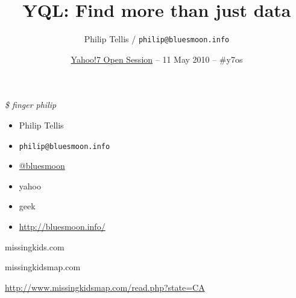 \documentclass{beamer}
\author{Philip Tellis / \texttt{philip@bluesmoon.info}}
\title{YQL: Find more than just data}
\date{\href{http://upcoming.yahoo.com/event/5648461/}{Yahoo!7 Open Session} -- 11 May 2010 -- \#y7os}
\begin{document}
\begin{frame}
  \titlepage
\end{frame}


\begin{frame}{\textit{\$ finger philip}}
  \begin{itemize}
  \item Philip Tellis
  \item \small{\texttt{philip@bluesmoon.info}}
  \item \href{http://twitter.com/bluesmoon}{@bluesmoon}
  \item yahoo
  \item geek
  \item \href{http://bluesmoon.info/}{http://bluesmoon.info/}
  \end{itemize}
\end{frame}


\begin{frame}{}
\end{frame}

\begin{frame}{missingkids.com}
\end{frame}

\begin{frame}{missingkidsmap.com}
  \begin{center}
  \href{http://www.missingkidsmap.com/read.php?state=CA}{http://www.missingkidsmap.com/read.php?state=CA}
  \end{center}
\end{frame}
\end{document}
